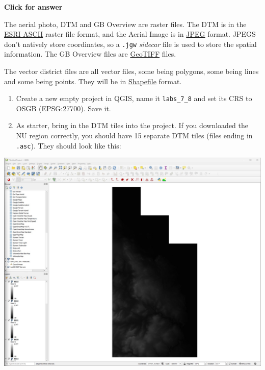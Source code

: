 \documentclass[
  letterpaper,
  DIV=11,
  numbers=noendperiod]{scrreprt}
\begin{document}
\begin{tcolorbox}[enhanced jigsaw, toprule=.15mm, breakable, left=2mm, colframe=quarto-callout-important-color-frame, colback=white, arc=.35mm, leftrule=.75mm, opacityback=0, rightrule=.15mm, bottomrule=.15mm]

\vspace{-3mm}\textbf{Click for answer}\vspace{3mm}

The aerial photo, DTM and GB Overview are raster files. The DTM is in
the \href{https://support.geocue.com/ascii-raster-files-asc/}{ESRI
ASCII} raster file format, and the Aerial Image is in
\href{https://en.wikipedia.org/wiki/JPEG}{JPEG} format. JPEGS don't
natively store coordinates, so a \texttt{.jgw} \emph{sidecar} file is
used to store the spatial information. The GB Overview files are
\href{https://www.ogc.org/standard/geotiff/}{GeoTIFF} files.

The vector district files are all vector files, some being polygons,
some being lines and some being points. They will be in
\href{https://en.wikipedia.org/wiki/Shapefile}{Shapefile} format.

\end{tcolorbox}

\begin{enumerate}
\def\labelenumi{(\arabic{enumi})}
\setcounter{enumi}{193}
\item
  Create a new empty project in QGIS, name it \texttt{labs\_7\_8} and
  set its CRS to OSGB (EPSG:27700). Save it.
\item
  As starter, bring in the DTM tiles into the project. If you downloaded
  the NU region correctly, you should have 15 separate DTM tiles (files
  ending in \texttt{.asc}). They should look like this:
\end{enumerate}

\includegraphics{images/lab_7/lab7_fig4_demsl.jpg}
\end{document}
